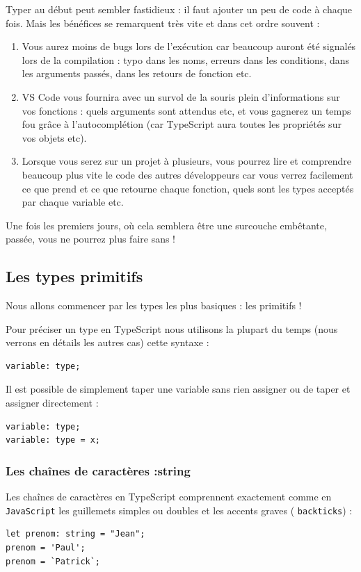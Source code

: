 \documentclass{article}
\begin{document}
Typer au début peut sembler fastidieux : il faut ajouter un peu de code à chaque fois. Mais les bénéfices se remarquent très vite et dans cet ordre souvent :
\begin{enumerate}
\item  Vous aurez moins de bugs lors de l'exécution car beaucoup auront été signalés lors de la compilation : typo dans les noms, erreurs dans les conditions, dans les arguments passés, dans les retours de fonction etc.

\item   {\color{blue} VS} Code vous fournira avec un survol de la souris plein d'informations sur vos fonctions : quels arguments sont attendus etc, et vous gagnerez un temps fou grâce à l'autocomplétion (car  {\color{monOrange}TypeScript}  aura toutes les propriétés sur vos objets etc).

\item   Lorsque vous serez sur un projet à plusieurs, vous pourrez lire et comprendre beaucoup plus vite le code des autres développeurs car vous verrez facilement ce que prend et ce que retourne chaque fonction, quels sont les types acceptés par chaque variable etc.

\end{enumerate}
Une fois les premiers jours, où cela semblera être une surcouche embêtante, passée, vous ne pourrez plus faire sans !

\subsection{Les types primitifs}
Nous allons commencer par les types les plus basiques : les primitifs !

Pour préciser un type en  {\color{monOrange}TypeScript}  nous utilisons la plupart du temps (nous verrons en détails les autres cas) cette syntaxe :
\begin{verbatim}
variable: type;
\end{verbatim}

Il est possible de simplement taper une variable sans rien assigner ou de taper et assigner directement :
\begin{verbatim}
variable: type;
variable: type = x;
\end{verbatim}

\subsubsection{Les chaînes de caractères :string}
Les chaînes de caractères en {\color{monOrange}TypeScript}  comprennent exactement comme en {\tt JavaScript} les guillemets simples ou doubles et les accents graves ( {\tt backticks}) :
\begin{verbatim}
let prenom: string = "Jean";
prenom = 'Paul';
prenom = `Patrick`;
\end{verbatim}
\end{document}
